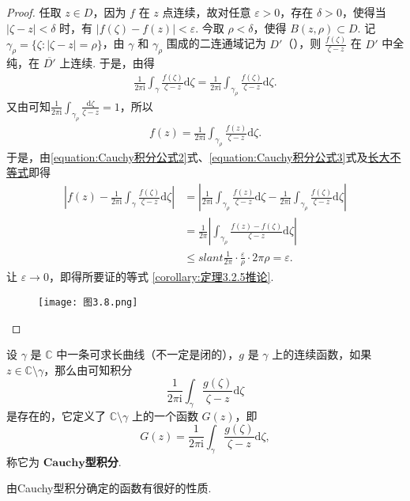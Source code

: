 \documentclass[../../main.tex]{subfiles}
\begin{document}
\begin{proof}
任取 \( z \in D \)，因为 \( f \) 在 \( z \) 点连续，故对任意 \( \varepsilon > 0 \)，存在 \( \delta > 0 \)，使得当 \( |\zeta - z| < \delta \) 时，有 \( |f(\zeta) - f(z)| < \varepsilon \). 今取 \( \rho < \delta \)，使得 \( B(z, \rho) \subset D \). 记 \( \gamma_{\rho} = \{\zeta: |\zeta - z| = \rho\} \)，由 \( \gamma \) 和 \( \gamma_{\rho} \) 围成的二连通域记为 \( D' \)（），则 \( \frac{f(\zeta)}{\zeta - z} \) 在 \( D' \) 中全纯，在 \( \overline{D'} \) 上连续. 于是，由得
\begin{align}\label{equation:Cauchy积分公式2}
\frac{1}{2\pi \mathrm{i}} \int_{\gamma} \frac{f(\zeta)}{\zeta - z} \mathrm{d}\zeta = \frac{1}{2\pi \mathrm{i}} \int_{\gamma_{\rho}} \frac{f(\zeta)}{\zeta - z} \mathrm{d}\zeta.
\end{align}
又由可知\( \frac{1}{2\pi \mathrm{i}} \int_{\gamma_{\rho}} \frac{\mathrm{d}\zeta}{\zeta - z} = 1 \)，所以
\begin{align}
f(z) = \frac{1}{2\pi \mathrm{i}} \int_{\gamma_{\rho}} \frac{f(z)}{\zeta - z} \mathrm{d}\zeta. \label{equation:Cauchy积分公式3}
\end{align}
于是，由\eqref{equation:Cauchy积分公式2}式、\eqref{equation:Cauchy积分公式3}式及\hyperref[proposition:长大不等式]{长大不等式}即得
\begin{align*}
\left| f(z) - \frac{1}{2\pi \mathrm{i}} \int_{\gamma} \frac{f(\zeta)}{\zeta - z} \mathrm{d}\zeta \right| 
&= \left| \frac{1}{2\pi \mathrm{i}} \int_{\gamma_{\rho}} \frac{f(z)}{\zeta - z} \mathrm{d}\zeta - \frac{1}{2\pi \mathrm{i}} \int_{\gamma_{\rho}} \frac{f(\zeta)}{\zeta - z} \mathrm{d}\zeta \right| \\
&= \frac{1}{2\pi} \left| \int_{\gamma_{\rho}} \frac{f(z) - f(\zeta)}{\zeta - z} \mathrm{d}\zeta \right| \\
& \leqslant slant \frac{1}{2\pi} \cdot \frac{\varepsilon}{\rho} \cdot 2\pi \rho = \varepsilon.
\end{align*}
让 \( \varepsilon \to 0 \)，即得所要证的等式 \eqref{corollary:定理3.2.5推论}. 
\begin{figure}[H]
\centering
\texttt{[image: 图3.8.png]}
\caption{}
\label{figure:图3.8}
\end{figure}
\end{proof}

\begin{definition}
设 \( \gamma \) 是 \( \mathbb{C} \) 中一条可求长曲线（不一定是闭的），\( g \) 是 \( \gamma \) 上的连续函数，如果 \( z \in \mathbb{C} \setminus \gamma \)，那么由可知积分
\[
\frac{1}{2\pi \mathrm{i}} \int_{\gamma} \frac{g(\zeta)}{\zeta - z} \mathrm{d}\zeta
\]
是存在的，它定义了 \( \mathbb{C} \setminus \gamma \) 上的一个函数 \( G(z) \)，即
\[
G(z) = \frac{1}{2\pi \mathrm{i}} \int_{\gamma} \frac{g(\zeta)}{\zeta - z} \mathrm{d}\zeta,
\]
称它为 $\mathbf{Cauchy}$\textbf{型积分}. 
\end{definition}
\begin{note}
由Cauchy型积分确定的函数有很好的性质. 
\end{note}
\end{document}
